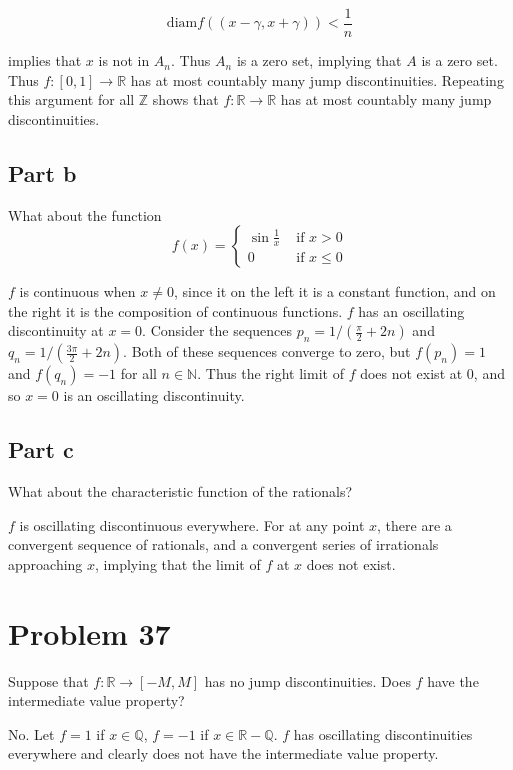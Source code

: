 \documentclass{article}
\newcommand{\R}{\mathbb{R}}
\newcommand{\Q}{\mathbb{Q}}
\newcommand{\Z}{\mathbb{Z}}
\newcommand{\N}{\mathbb{N}}
\newcommand{\diam}{\text{diam}}
\begin{document}
\[
\diam f((x - \gamma, x + \gamma)) < \frac{1}{n}
\]

implies that $x$ is not in $A_n$. Thus $A_n$ is a zero set, implying that $A$ is a zero set. Thus $f:[0, 1] \rightarrow \R$ has at most countably many jump discontinuities. Repeating this argument for all $\Z$ shows that $f:\R \rightarrow \R$ has at most countably many jump discontinuities.

\subsection*{Part b}

What about the function
\[
f(x) = 
\begin{cases}
\sin \frac{1}{x} & \text{ if } x > 0 \\
0 & \text{ if } x \leq 0
\end{cases}
\]

$f$ is continuous when $x \neq 0$, since it on the left it is a constant function, and on the right it is the composition of continuous functions. $f$ has an oscillating discontinuity at $x=0$. Consider the sequences $p_n = 1/ (\frac{\pi}{2} + 2n)$ and $q_n = 1/ (\frac{3\pi}{2} + 2n)$. Both of these sequences converge to zero, but $f(p_n) = 1$ and $f(q_n) = -1$ for all $n \in \N$. Thus the right limit of $f$ does not exist at $0$, and so $x=0$ is an oscillating discontinuity.

\subsection*{Part c}

What about the characteristic function of the rationals?

$f$ is oscillating discontinuous everywhere. For at any point $x$, there are a convergent sequence of rationals, and a convergent series of irrationals approaching $x$, implying that the limit of $f$ at $x$ does not exist.

\section*{Problem 37}

Suppose that $f: \R \rightarrow [-M, M]$ has no jump discontinuities. Does $f$ have the intermediate value property?

No. Let $f = 1$ if $x \in \Q$, $f = -1$ if $x \in \R - \Q$. $f$ has oscillating discontinuities everywhere and clearly does not have the intermediate value property.
\end{document}
